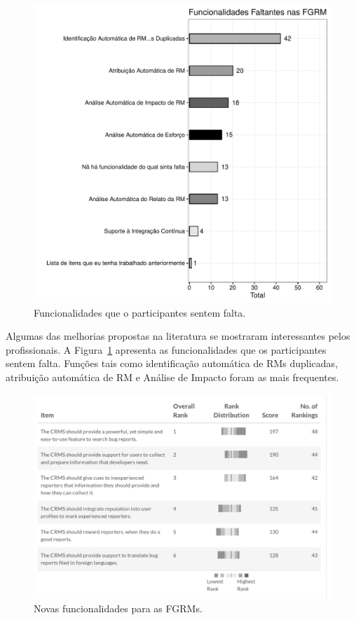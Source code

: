 \begin{figure}[htpb]
	\centering
	\includegraphics[width=0.8\linewidth]{./chapter-pesquisa-com-profissionais/img/grafico_melhorias_fgrm_funcionalidades_faltantes.pdf}
	\caption{Funcionalidades que o participantes sentem falta.}
\label{fig:grafico_melhorias_fgrm_funcionalidades_falantes}
\end{figure}

Algumas das melhorias propostas na literatura se mostraram interessantes pelos
profissionais. A
Figura~\ref{fig:grafico_melhorias_fgrm_funcionalidades_falantes} apresenta as
funcionalidades que os participantes sentem falta. Funções tais como
identificação automática de RMs duplicadas, atribuição automática de RM e
Análise de Impacto foram as mais frequentes.

\begin{figure}[htpb]
	\centering
	\includegraphics[width=0.8\linewidth]{./chapter-pesquisa-com-profissionais/img/grafico_melhorias_fgrm_melhorias.pdf}
	\caption{Novas funcionalidades para as FGRMs.}
\label{fig:ggrafico_melhorias_fgrm_melhorias}
\end{figure}

